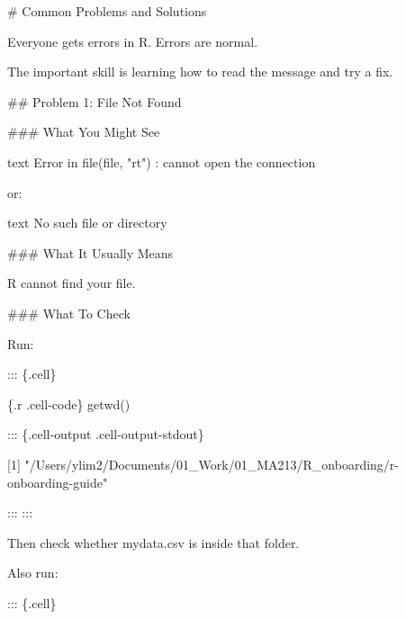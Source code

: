 \documentclass[
  letterpaper,
  DIV=11,
  numbers=noendperiod]{scrartcl}
\author{}
\date{}
\newenvironment{Shaded}{\begin{snugshade}}{\end{snugshade}}
\newcommand{\FunctionTok}[1]{\textcolor[rgb]{0.28,0.35,0.67}{#1}}
\newcommand{\InformationTok}[1]{\textcolor[rgb]{0.37,0.37,0.37}{#1}}
\newcommand{\NormalTok}[1]{\textcolor[rgb]{0.00,0.23,0.31}{#1}}
\renewcommand*\contentsname{Table of contents}
\newcommand\contentsname{Table of contents}
\begin{document}
\renewcommand*\contentsname{Table of contents}
{
\setcounter{tocdepth}{3}
\tableofcontents
}

\begin{Shaded}
\begin{Highlighting}[]
\FunctionTok{\# Common Problems and Solutions}

\NormalTok{Everyone gets errors in R. Errors are normal.}

\NormalTok{The important skill is learning how to read the message and try a fix.}

\FunctionTok{\#\# Problem 1: File Not Found}

\FunctionTok{\#\#\# What You Might See}

\InformationTok{\textasciigrave{}\textasciigrave{}\textasciigrave{}text}
\InformationTok{Error in file(file, "rt") : cannot open the connection}
\InformationTok{\textasciigrave{}\textasciigrave{}\textasciigrave{}}

\NormalTok{or:}

\InformationTok{\textasciigrave{}\textasciigrave{}\textasciigrave{}text}
\InformationTok{No such file or directory}
\InformationTok{\textasciigrave{}\textasciigrave{}\textasciigrave{}}

\FunctionTok{\#\#\# What It Usually Means}

\NormalTok{R cannot find your file.}

\FunctionTok{\#\#\# What To Check}

\NormalTok{Run:}


\NormalTok{::: \{.cell\}}

\InformationTok{\textasciigrave{}\textasciigrave{}\textasciigrave{}\{.r .cell{-}code\}}
\FunctionTok{getwd}\NormalTok{()}
\InformationTok{\textasciigrave{}\textasciigrave{}\textasciigrave{}}

\NormalTok{::: \{.cell{-}output .cell{-}output{-}stdout\}}

\InformationTok{\textasciigrave{}\textasciigrave{}\textasciigrave{}}
\InformationTok{[1] "/Users/ylim2/Documents/01\_Work/01\_MA213/R\_onboarding/r{-}onboarding{-}guide"}
\InformationTok{\textasciigrave{}\textasciigrave{}\textasciigrave{}}


\NormalTok{:::}
\NormalTok{:::}


\NormalTok{Then check whether }\InformationTok{\textasciigrave{}mydata.csv\textasciigrave{}}\NormalTok{ is inside that folder.}

\NormalTok{Also run:}


\NormalTok{::: \{.cell\}}


\end{Highlighting}
\end{Shaded}
\end{document}
